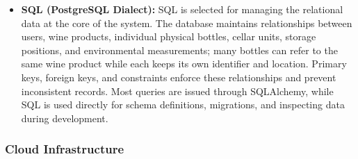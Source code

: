 \documentclass[conference]{IEEEtran}
\begin{document}
\begin{itemize}
    \item \textbf{SQL (PostgreSQL Dialect):} SQL is selected for managing the relational data at the core of the system. The database maintains relationships between users, wine products, individual physical bottles, cellar units, storage positions, and environmental measurements; many bottles can refer to the same wine product while each keeps its own identifier and location. Primary keys, foreign keys, and constraints enforce these relationships and prevent inconsistent records. Most queries are issued through SQLAlchemy, while SQL is used directly for schema definitions, migrations, and inspecting data during development.
\end{itemize}

\subsubsection{Cloud Infrastructure}
\end{document}
